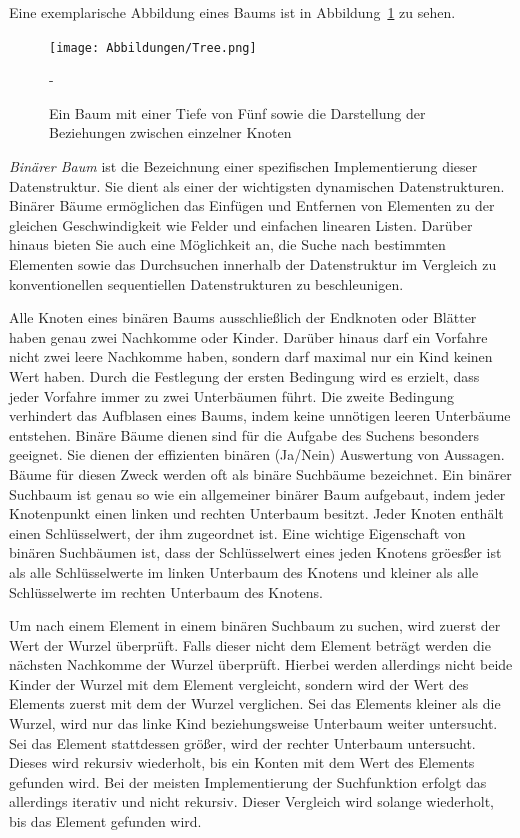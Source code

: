 Eine exemplarische Abbildung eines Baums ist in Abbildung~\ref{fig: tree} zu sehen.

\begin{figure}[t]
	\texttt{[image: Abbildungen/Tree.png]}
	\centering
	\caption{Ein Baum mit einer Tiefe von Fünf sowie die Darstellung der Beziehungen zwischen einzelner Knoten \autocite[390]{gumm_band_2016}}-
	\label{fig: tree}
\end{figure}

\textit{Binärer Baum} ist die Bezeichnung einer spezifischen Implementierung dieser Datenstruktur. Sie dient als einer der wichtigsten dynamischen Datenstrukturen. Binärer Bäume ermöglichen das Einfügen und Entfernen von Elementen zu der gleichen Geschwindigkeit wie Felder und einfachen linearen Listen. Darüber hinaus bieten Sie auch eine Möglichkeit an, die Suche nach bestimmten Elementen sowie das Durchsuchen innerhalb der Datenstruktur im Vergleich zu konventionellen sequentiellen Datenstrukturen zu beschleunigen. \autocite[617]{ernst_grundkurs_2020}

Alle Knoten eines binären Baums ausschließlich der Endknoten oder Blätter haben genau zwei Nachkomme oder Kinder. Darüber hinaus darf ein Vorfahre nicht zwei leere Nachkomme haben, sondern darf maximal nur ein Kind keinen Wert haben. Durch die Festlegung der ersten Bedingung wird es erzielt, dass jeder Vorfahre immer zu zwei Unterbäumen führt. Die zweite Bedingung verhindert das Aufblasen eines Baums, indem keine unnötigen leeren Unterbäume entstehen. Binäre Bäume dienen sind für die Aufgabe des Suchens besonders geeignet. Sie dienen der effizienten binären (Ja/Nein) Auswertung von Aussagen. Bäume für diesen Zweck werden oft als binäre Suchbäume bezeichnet. Ein binärer Suchbaum ist genau so wie ein allgemeiner binärer Baum aufgebaut, indem jeder Knotenpunkt einen linken und rechten Unterbaum besitzt. Jeder Knoten enthält einen Schlüsselwert, der ihm zugeordnet ist. Eine wichtige Eigenschaft von binären Suchbäumen ist, dass der Schlüsselwert eines jeden Knotens gröesßer ist als alle Schlüsselwerte im linken Unterbaum des Knotens und kleiner als alle Schlüsselwerte im rechten Unterbaum des Knotens. \autocite[94-95]{ollmert_datenstrukturen_2020}

Um nach einem Element in einem binären Suchbaum zu suchen, wird zuerst der Wert der Wurzel überprüft. Falls dieser nicht dem Element beträgt werden die nächsten Nachkomme der Wurzel überprüft. Hierbei werden allerdings nicht beide Kinder der Wurzel mit dem Element vergleicht, sondern wird der Wert des Elements zuerst mit dem der Wurzel verglichen. Sei das Elements kleiner als die Wurzel, wird nur das linke Kind beziehungsweise Unterbaum weiter untersucht. Sei das Element stattdessen größer, wird der rechter Unterbaum untersucht. Dieses wird rekursiv wiederholt, bis ein Konten mit dem Wert des Elements gefunden wird. Bei der meisten Implementierung der Suchfunktion erfolgt das allerdings iterativ und nicht rekursiv. Dieser Vergleich wird solange wiederholt, bis das Element gefunden wird. \autocite[139-140]{knebl_algorithmen_2021}

